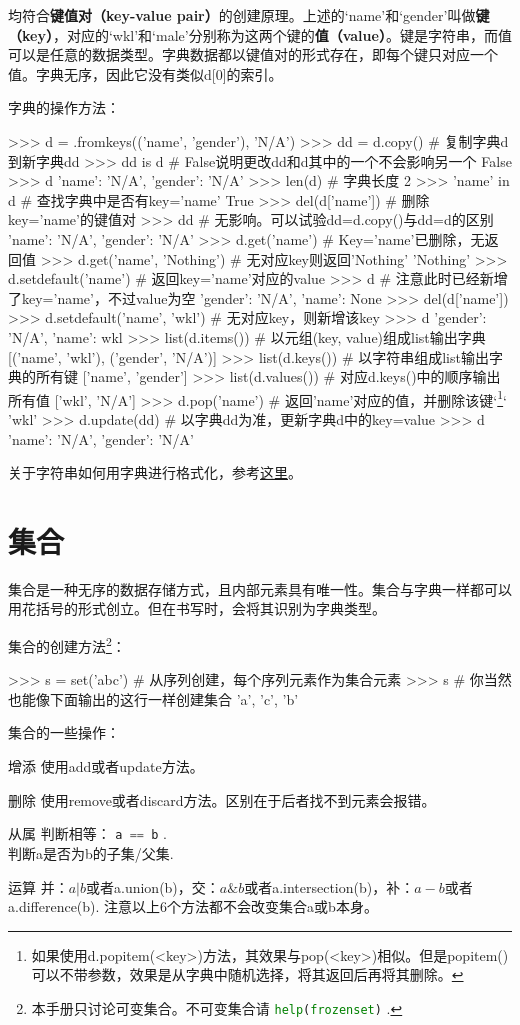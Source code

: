 \documentclass[a4paper,12pt]{report}
\newcommand{\pyline}[1]{{ \lstinline[language=Python, basicstyle=\ttfamily]{#1} }}
\newcommand{\python}{{\ttfamily{Python}}}
\newcommand{\mytt}[1]{{\ttfamily{#1}}}
\newcommand{\co}[1]{{\bfseries{#1}}}   %
\newenvironment{fead}{\begin{description}[font=\bfseries\uline]}
    {\end{description}}
\begin{document}
均符合\co{键值对（key-value pair）}的创建原理。上述的`name'和`gender'叫做\co{键（key）}，对应的`wkl'和`male'分别称为这两个键的\co{值（value）}。键是字符串，而值可以是任意的数据类型。字典数据都以键值对的形式存在，即每个键只对应一个值。字典无序，因此它没有类似d[0]的索引。

字典的操作方法：
\begin{py}
>>> d = {}.fromkeys(('name', 'gender'), 'N/A')
>>> dd = d.copy()	# 复制字典d到新字典dd
>>> dd is d    # False说明更改dd和d其中的一个不会影响另一个
False
>>> d
{'name': 'N/A', 'gender': 'N/A'}
>>> len(d)	# 字典长度
2
>>> 'name' in d # 查找字典中是否有key='name'
True
>>> del(d['name']) # 删除key='name'的键值对
>>> dd	# 无影响。可以试验dd=d.copy()与dd=d的区别
{'name': 'N/A', 'gender': 'N/A'}
>>> d.get('name')  # Key='name'已删除，无返回值
>>> d.get('name', 'Nothing')	# 无对应key则返回'Nothing'
'Nothing'
>>> d.setdefault('name') # 返回key='name'对应的value
>>> d	# 注意此时已经新增了key='name'，不过value为空
{'gender': 'N/A', 'name': None}
>>> del(d['name'])
>>> d.setdefault('name', 'wkl') # 无对应key，则新增该key
>>> d
{'gender': 'N/A', 'name': wkl}
>>> list(d.items()) # 以元组(key, value)组成list输出字典
[('name', 'wkl'), ('gender', 'N/A')]
>>> list(d.keys()) # 以字符串组成list输出字典的所有键
['name', 'gender']
>>> list(d.values()) # 对应d.keys()中的顺序输出所有值
['wkl', 'N/A']
>>> d.pop('name') # 返回'name'对应的值，并删除该键`\footnote{如果使用d.popitem(<key>)方法，其效果与pop(<key>)相似。但是popitem()可以不带参数，效果是从字典中随机选择，将其返回后再将其删除。}`
'wkl'
>>> d.update(dd) # 以字典dd为准，更新字典d中的key=value
>>> d
{'name': 'N/A', 'gender': 'N/A'}
\end{py}

关于字符串如何用字典进行格式化，参考\hyperref[strformat-dict]{这里}。

\section{集合}
集合是一种无序的数据存储方式，且内部元素具有唯一性。集合与字典一样都可以用花括号的形式创立。但在书写\mytt{a=\{\}}时，\python 会将其识别为字典类型。

集合的创建方法\footnote{本手册只讨论可变集合。不可变集合请\pyline{help(frozenset)}. }：
\begin{py}
>>> s = set('abc') # 从序列创建，每个序列元素作为集合元素
>>> s  # 你当然也能像下面输出的这行一样创建集合
{'a', 'c', 'b'}
\end{py}

集合的一些操作：
\begin{fead}
\item[增添] 使用add或者update方法。
\item[删除] 使用remove或者discard方法。区别在于后者找不到元素会报错。
\item[从属] 判断相等：\pyline{a == b}. \\
	判断a是否为b的子集/父集\mytt{a.issubset(b)/a.issuperset(b)}. 
\item[运算] 并：$a | b$或者a.union(b)，交：$a \& b$或者a.intersection(b)，补：$a - b$或者a.difference(b). 注意以上6个方法都不会改变集合a或b本身。
\end{fead}
\end{document}
